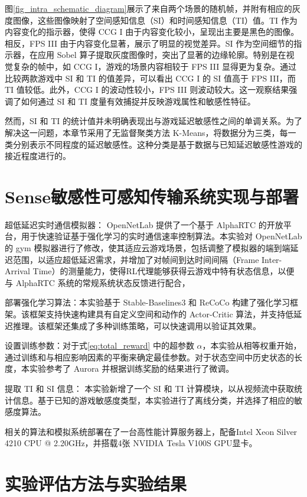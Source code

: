 图\ref{fig_intra_schematic_diagram}展示了来自两个场景的随机帧，并附有相应的灰度图像，这些图像映射了空间感知信息（SI）和时间感知信息（TI）值。TI 作为内容变化的指示器，使得 CCG I 由于内容变化较小，呈现出主要是黑色的图像。相反，FPS III 由于内容变化显著，展示了明显的视觉差异。SI 作为空间细节的指示器，在应用 Sobel 算子提取灰度图像时，突出了显著的边缘轮廓。特别是在视觉复杂的帧中，如 CCG I，游戏的场景内容相较于 FPS III 显得更为复杂。通过比较两款游戏中 SI 和 TI 的值差异，可以看出 CCG I 的 SI 值高于 FPS III，而 TI 值较低。此外，CCG I 的波动性较小，FPS III 则波动较大。这一观察结果强调了如何通过 SI 和 TI 度量有效捕捉并反映游戏属性和敏感性特征。

然而，SI 和 TI 的统计值并未明确表现出与游戏延迟敏感性之间的单调关系。为了解决这一问题，本章节采用了无监督聚类方法 K-Means，将数据分为三类，每一类分别表示不同程度的延迟敏感性。这种分类是基于数据与已知延迟敏感性游戏的接近程度进行的。

\section{Sense敏感性可感知传输系统实现与部署}
超低延迟实时通信模拟器： OpenNetLab \cite{eo2022opennetlab} 提供了一个基于 AlphaRTC 的开放平台，用于快速验证基于强化学习的实时通信速率控制算法。本实验对 OpenNetLab 的 gym 模拟器进行了修改，使其适应云游戏场景，包括调整了模拟器的端到端延迟范围，以适应超低延迟需求，并增加了对帧间到达时间间隔（Frame Inter-Arrival Time）的测量能力，使得RL代理能够获得云游戏中特有状态信息，以便与 AlphaRTC 系统的常规系统状态反馈进行配合，

部署强化学习算法：本实验基于 Stable-Baselines3 \cite{stable-baselines3} 和 ReCoCo \cite{markudova2023recoco} 构建了强化学习框架。该框架支持快速构建具有自定义空间和动作的 Actor-Critic 算法，并支持低延迟推理。该框架还集成了多种训练策略，可以快速调用以验证其效果。

设置训练参数：对于式\eqref{eq:total_reward} 中的超参数 $\alpha$，本实验从相等权重开始，通过训练和与相应影响因素的平衡来确定最佳参数。对于状态空间中历史状态的长度，本实验参考了 Aurora \cite{markudova2023recoco} 并根据训练奖励的结果进行了微调。

提取 TI 和 SI 信息： 本实验新增了一个 SI 和 TI 计算模块，以从视频流中获取统计信息。基于已知的游戏敏感度类型，本实验进行了离线分类，并选择了相应的敏感度算法。

相关的算法和模拟系统部署在了一台高性能计算服务器上，配备Intel Xeon Silver 4210 CPU @ 2.20GHz，并搭载4张 NVIDIA Tesla V100S GPU显卡。
\section{实验评估方法与实验结果}
